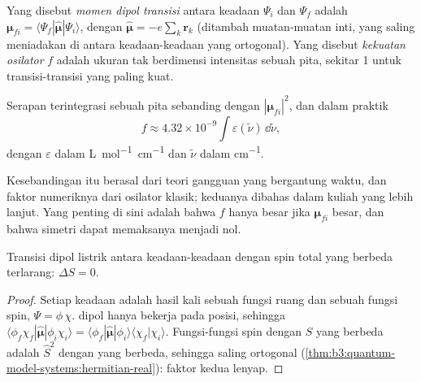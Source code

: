\begin{definition}\label{def:b3:electronic-spectroscopy:transition-dipole}
Yang disebut \emph{momen dipol transisi} antara
keadaan $\Psi_i$ dan $\Psi_f$ adalah $\boldsymbol\mu_{fi} = \langle\Psi_f|\hat{\boldsymbol\mu}|\Psi_i
\rangle$, dengan $\hat{\boldsymbol\mu} = -e\sum_k\mathbf r_k$ (ditambah muatan-muatan
inti, yang saling meniadakan di antara keadaan-keadaan yang ortogonal). Yang
disebut \emph{kekuatan osilator} $f$ adalah ukuran
tak berdimensi intensitas sebuah pita, sekitar 1 untuk transisi-transisi
yang paling kuat.
\end{definition}

\begin{proposition}\label{prop:b3:electronic-spectroscopy:intensity}
Serapan terintegrasi sebuah pita sebanding dengan $|\boldsymbol\mu_{fi}|^2$,
dan dalam praktik
\[
f \approx 4.32\times10^{-9}\int\varepsilon(\tilde\nu)\,\dd\tilde\nu,
\]
dengan $\varepsilon$ dalam \unit{L.mol^{-1}.cm^{-1}} dan $\tilde\nu$ dalam \unit{cm^{-1}}.
\end{proposition}
\admitted

Kesebandingan itu berasal dari teori gangguan yang bergantung waktu, dan
faktor numeriknya dari osilator klasik; keduanya dibahas dalam kuliah yang
lebih lanjut. Yang penting di sini adalah bahwa $f$ hanya besar jika
$\boldsymbol\mu_{fi}$ besar, dan bahwa simetri dapat memaksanya menjadi nol.

\begin{theorem}\label{thm:b3:electronic-spectroscopy:spin-rule}
Transisi dipol listrik antara keadaan-keadaan dengan spin total yang berbeda
terlarang: $\Delta S = 0$.
\end{theorem}

\begin{proof}
Setiap keadaan adalah hasil kali sebuah fungsi ruang dan sebuah fungsi spin,
$\Psi = \phi\,\chi$.  dipol hanya bekerja pada posisi, sehingga
$\langle\phi_f\chi_f|\hat{\boldsymbol\mu}|
\phi_i\chi_i\rangle = \langle\phi_f|\hat{\boldsymbol\mu}|\phi_i\rangle\langle\chi_f|\chi_i\rangle$.
Fungsi-fungsi spin dengan $S$ yang berbeda adalah  $\hat S^2$
dengan  yang berbeda, sehingga saling ortogonal
(\cref{thm:b3:quantum-model-systems:hermitian-real}): faktor kedua lenyap.
\end{proof}

